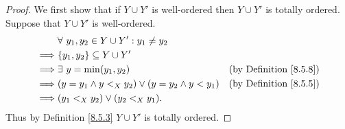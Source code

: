 \begin{proof}
    We first show that if \(Y \cup Y'\) is well-ordered then \(Y \cup Y'\) is totally ordered.
    Suppose that \(Y \cup Y'\) is well-ordered.
    \begin{align*}
                 & \forall\ y_1, y_2 \in Y \cup Y' : y_1 \neq y_2                                              \\
        \implies & \{y_1, y_2\} \subseteq Y \cup Y'                                                            \\
        \implies & \exists\ y = \min(y_1, y_2)                            & \text{(by Definition \ref{8.5.8})} \\
        \implies & (y = y_1 \land y <_X y_2) \lor (y = y_2 \land y < y_1) & \text{(by Definition \ref{8.5.5})} \\
        \implies & (y_1 <_X y_2) \lor (y_2 <_X y_1).
    \end{align*}
    Thus by Definition \ref{8.5.3} \(Y \cup Y'\) is totally ordered.


\end{proof}
